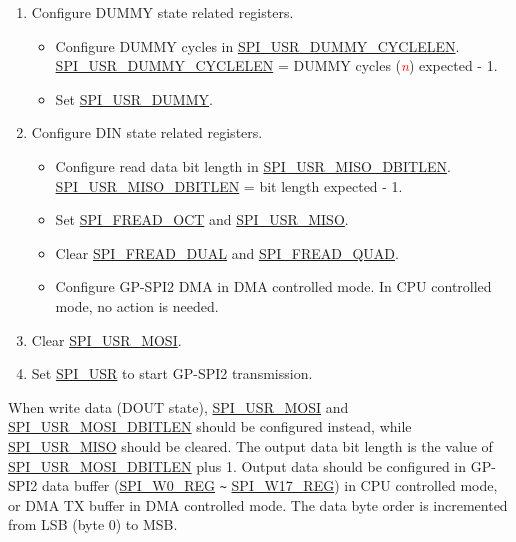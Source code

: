 \documentclass[main\_\_EN.tex]{subfiles}
\begin{document}
\begin{enumerate}
    \item Configure DUMMY state related registers.
        \begin{itemize}
            \item Configure DUMMY cycles in \hyperref[fielddesc:SPIUSRDUMMYCYCLELEN]{SPI\_USR\_DUMMY\_CYCLELEN}. \hyperref[fielddesc:SPIUSRDUMMYCYCLELEN]{SPI\_USR\_DUMMY\_CYCLELEN} = DUMMY cycles (\textcolor{red}{\it{n}}) expected - 1.
            \item Set \hyperref[fielddesc:SPIUSRDUMMY]{SPI\_USR\_DUMMY}.
        \end{itemize}

    \item Configure DIN state related registers.
        \begin{itemize}
            \item Configure read data bit length in \hyperref[fielddesc:SPIUSRMISODBITLEN]{SPI\_USR\_MISO\_DBITLEN}. \hyperref[fielddesc:SPIUSRMISODBITLEN]{SPI\_USR\_MISO\_DBITLEN} = bit length expected - 1.
            \item Set \hyperref[fielddesc:SPIFREADOCT]{SPI\_FREAD\_OCT} and \hyperref[fielddesc:SPIUSRMISO]{SPI\_USR\_MISO}.
            \item Clear \hyperref[fielddesc:SPIFREADDUAL]{SPI\_FREAD\_DUAL} and \hyperref[fielddesc:SPIFREADQUAD]{SPI\_FREAD\_QUAD}.
            \item Configure GP-SPI2 DMA in DMA controlled mode. In CPU controlled mode, no action is needed.
        \end{itemize}

    \item Clear \hyperref[fielddesc:SPIUSRMOSI]{SPI\_USR\_MOSI}.

    \item Set \hyperref[fielddesc:SPIUSR]{SPI\_USR} to start GP-SPI2 transmission.
\end{enumerate}

When write data (DOUT state), \hyperref[fielddesc:SPIUSRMOSI]{SPI\_USR\_MOSI} and \hyperref[fielddesc:SPIUSRMOSIDBITLEN]{SPI\_USR\_MOSI\_DBITLEN} should be configured instead, while \hyperref[fielddesc:SPIUSRMISO]{SPI\_USR\_MISO} should be cleared. The output data bit length is the value of \hyperref[fielddesc:SPIUSRMOSIDBITLEN]{SPI\_USR\_MOSI\_DBITLEN} plus 1. Output data should be configured in GP-SPI2 data buffer (\hyperref[regdesc:SPIW0REG]{SPI\_W0\_REG} \verb+~+ \hyperref[regdesc:SPIW17REG]{SPI\_W17\_REG}) in CPU controlled mode, or DMA TX buffer in DMA controlled mode. The data byte order is incremented from LSB (byte 0) to MSB.
\end{document}
